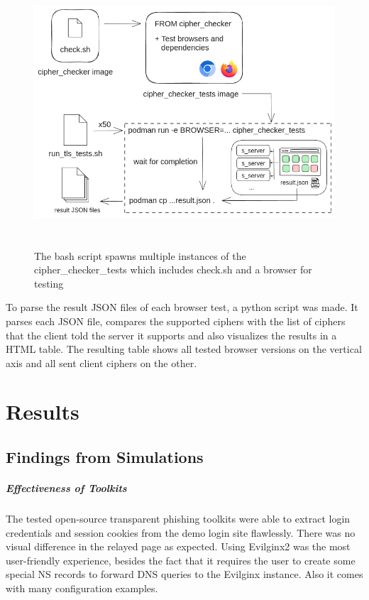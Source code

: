 \documentclass[12pt]{scrbook}
\begin{document}
\begin{figure}[!h]
	\centering
	\includegraphics[height=10cm]{./images/cipher_checker_tests.png}
	\caption{The bash script spawns multiple instances of the
		cipher\_checker\_tests which includes check.sh and a browser for testing}
\end{figure}

To parse the result JSON files of each browser test, a python script was made.
It parses each JSON file, compares the supported ciphers
with the list of ciphers that the client told the server it supports and also
visualizes the results in a HTML table.
The resulting table shows all tested browser versions on the vertical axis and
all sent client ciphers on the other.

\newpage

\chapter{Results}
\section{Findings from Simulations}

\paragraph{Effectiveness of Toolkits}
The tested open-source transparent phishing toolkits were able to extract login credentials
and session cookies from the demo login site flawlessly. There was no visual difference in the relayed page
as expected. Using Evilginx2 was the most user-friendly experience, besides the fact that it requires the user
to create some special NS records to forward DNS queries to the Evilginx instance. Also it comes with many
configuration examples.
\end{document}
